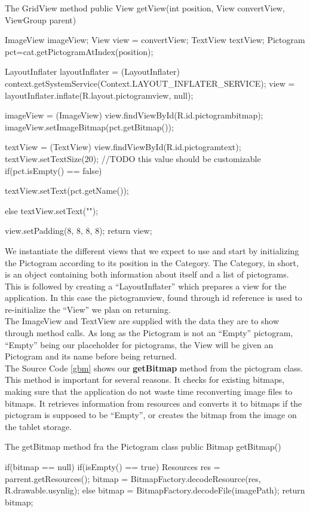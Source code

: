 \begin{source}[{gridviewm}]{The GridView method}
	public View getView(int position, View convertView, ViewGroup parent) 
	{
		ImageView imageView;
		View view = convertView;
		TextView textView;
		Pictogram pct=cat.getPictogramAtIndex(position);

		LayoutInflater layoutInflater = (LayoutInflater) context.getSystemService(Context.LAYOUT_INFLATER_SERVICE);
		view = layoutInflater.inflate(R.layout.pictogramview, null);

		imageView = (ImageView) view.findViewById(R.id.pictogrambitmap); 
		imageView.setImageBitmap(pct.getBitmap());

		textView = (TextView) view.findViewById(R.id.pictogramtext);
		textView.setTextSize(20);	//TODO this value should be customizable
		if(pct.isEmpty() == false)
		{

			textView.setText(pct.getName());
		}
		else
		{
			textView.setText("");
		}

		view.setPadding(8, 8, 8, 8);
		return view;
	}
\end{source}
We instantiate the different views that we expect to use and start by initializing the Pictogram according to its position in the Category.
The Category, in short, is an object containing both information about itself and a list of pictograms.
This is followed by creating a ``LayoutInflater'' which prepares a view for the application.
In this case the pictogramview, found through id reference is used to re-initialize the ``View'' we plan on returning.\\
The ImageView and TextView are supplied with the data they are to show through method calls. 
As long as the Pictogram is not an ``Empty'' pictogram, ``Empty'' being our placeholder for pictograms, the View will be given an Pictogram and its name before being returned.\\

The Source Code \ref{gbm} shows our \textbf{getBitmap} method from the pictogram class.
This method is important for several reasons. It checks for existing bitmaps, making sure that the application do not waste time reconverting image files to bitmaps.
It retrieves information from resources and converts it to bitmaps if the pictogram is supposed to be ``Empty'', or creates the bitmap from the image on the tablet storage.

\begin{source}[{gbm}]{The getBitmap method fra the Pictogram class}
	public Bitmap getBitmap()
	{
		if(bitmap == null)
		{
			if(isEmpty() == true)
			{
				Resources res = parrent.getResources();
				bitmap = BitmapFactory.decodeResource(res, R.drawable.usynlig);
			}
			else
			{
				bitmap = BitmapFactory.decodeFile(imagePath);
			}
		}
		return bitmap;
	
	}
\end{source}



